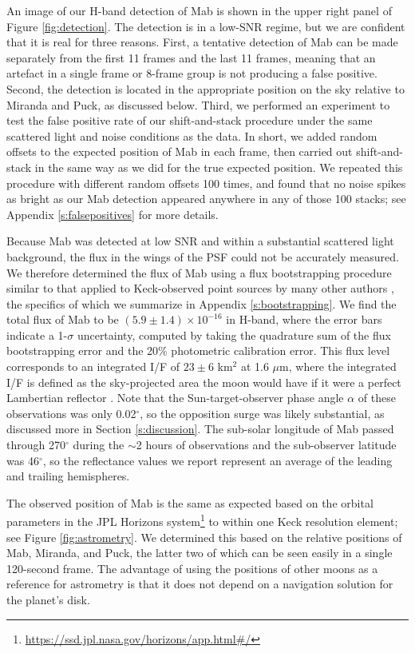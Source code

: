 \documentclass[preprint]{aastex631}
\begin{document}
An image of our H-band detection of Mab is shown in the upper right panel of Figure \ref{fig:detection}. The detection is in a low-SNR regime, but we are confident that it is real for three reasons. First, a tentative detection of Mab can be made separately from the first 11 frames and the last 11 frames, meaning that an artefact in a single frame or 8-frame group is not producing a false positive. Second, the detection is located in the appropriate position on the sky relative to Miranda and Puck, as discussed below. Third, we performed an experiment to test the false positive rate of our shift-and-stack procedure under the same scattered light and noise conditions as the data. In short, we added random offsets to the expected position of Mab in each frame, then carried out shift-and-stack in the same way as we did for the true expected position. We repeated this procedure with different random offsets 100 times, and found that no noise spikes as bright as our Mab detection appeared anywhere in any of those 100 stacks; see Appendix \ref{s:falsepositives} for more details.

Because Mab was detected at low SNR and within a substantial scattered light background, the flux in the wings of the PSF could not be accurately measured. We therefore determined the flux of Mab using a flux bootstrapping procedure similar to that applied to Keck-observed point sources by many other authors \citep[e.g.,][]{gibbard05, molter19, paradis23}, the specifics of which we summarize in Appendix \ref{s:bootstrapping}. We find the total flux of Mab to be $(5.9 \pm 1.4)\times10^{-16}$ \ergsec{} in H-band, where the error bars indicate a 1-$\sigma$ uncertainty, computed by taking the quadrature sum of the flux bootstrapping error and the 20\% photometric calibration error. This flux level corresponds to an integrated I/F of $23 \pm 6$ km$^{2}$ at 1.6 $\mu$m, where the integrated I/F is defined as the sky-projected area the moon would have if it were a perfect Lambertian reflector \citep[i.e., a geometric albedo of unity;][]{karkoschka01}. Note that the Sun-target-observer phase angle $\alpha$ of these observations was only 0.02$^\circ$, so the opposition surge was likely substantial, as discussed more in Section \ref{s:discussion}. The sub-solar longitude of Mab passed through 270$^\circ$ during the $\sim$2 hours of observations and the sub-observer latitude was 46$^\circ$, so the reflectance values we report represent an average of the leading and trailing hemispheres.

The observed position of Mab is the same as expected based on the orbital parameters in the JPL Horizons system\footnote{\url{https://ssd.jpl.nasa.gov/horizons/app.html\#/}} to within one Keck resolution element; see Figure \ref{fig:astrometry}. We determined this based on the relative positions of Mab, Miranda, and Puck, the latter two of which can be seen easily in a single 120-second frame. The advantage of using the positions of other moons as a reference for astrometry is that it does not depend on a navigation solution for the planet's disk.
\end{document}
